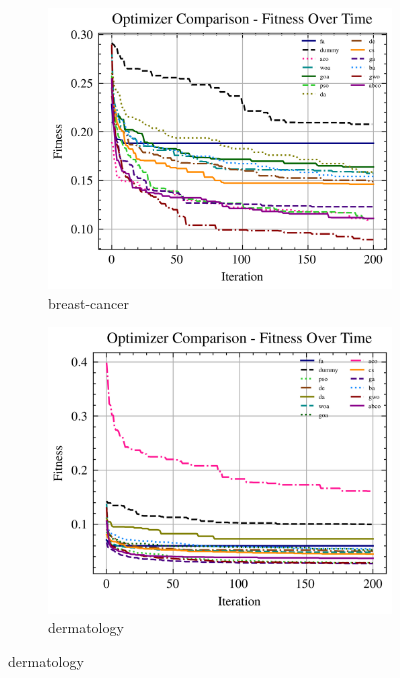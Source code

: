 \begin{figure}[htp]
    \centering
    \begin{subfigure}[htp]{0.45\textwidth}
        \includegraphics[width=\textwidth]{imagenes/fitness_charts/img/binary/breast-cancer/optimizers_fitness_knn.png}
        \caption{breast-cancer}
        \label{fig:convergencia_breast_cancer_knn}
    \end{subfigure}
    \begin{subfigure}[htp]{0.45\textwidth}
        \includegraphics[width=\textwidth]{imagenes/fitness_charts/img/binary/dermatology/optimizers_fitness_knn.png}
        \caption{dermatology}
        \label{fig:convergencia_dermatology_knn}
    \end{subfigure}


\end{figure}
